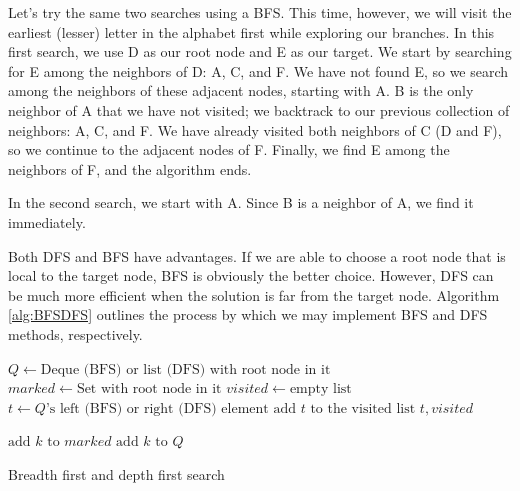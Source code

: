 Let's try the same two searches using a BFS. This time, however, we will visit the earliest (lesser) letter in the alphabet first while exploring our branches.
In this first search, we use D as our root node and E as our target.
We start by searching for E among the neighbors of D: A, C, and F.
We have not found E, so we search among the neighbors of these adjacent nodes, starting with A.
B is the only neighbor of A that we have not visited; we backtrack to our previous collection of neighbors: A, C, and F.
We have already visited both neighbors of C (D and F), so we continue to the adjacent nodes of F. Finally, we find E among the neighbors of F, and the algorithm ends.

In the second search, we start with A.
Since B is a neighbor of A, we find it immediately.

Both DFS and BFS have advantages.
If we are able to choose a root node that is local to the target node, BFS is obviously the better choice. However, DFS can be much more efficient when the solution is far from the target node. 
Algorithm \ref{alg:BFSDFS} outlines the process by which we may implement BFS and DFS methods, respectively.

\begin{algorithm}
\begin{algorithmic}[1]
	\State $Q \gets \text{Deque (BFS) or list (DFS) with root node in it}$	
	\State $marked \gets \text{Set with root node in it}$	
	\State $visited \gets \text{empty list}$	
							
		\State $t \gets Q\text{'s left (BFS) or right (DFS) element}$	
		\State $\text{add }t \text{ to the visited list}$
									
			\State {} $t,visited$
		
		\Else										{}
					\State $\text{add } k \text{ to } marked$
					\State $\text{add } k \text{ to } Q$
				\EndIf
			\EndFor
		\EndIf
	\EndWhile
\EndProcedure
\end{algorithmic}
\caption{Breadth first and depth first search}
\label{alg:BFSDFS}
\end{algorithm}

